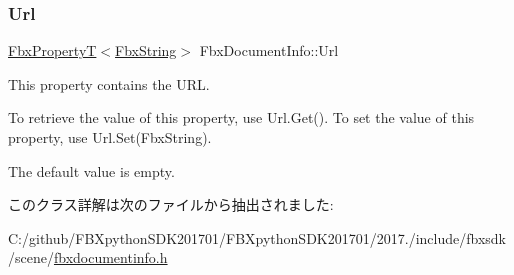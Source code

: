\subsubsection{\texorpdfstring{Url}{Url}}
{\footnotesize\ttfamily \hyperlink{class_fbx_property_t}{Fbx\+PropertyT}$<$\hyperlink{class_fbx_string}{Fbx\+String}$>$ Fbx\+Document\+Info\+::\+Url}

This property contains the U\+RL.

To retrieve the value of this property, use Url.\+Get(). To set the value of this property, use Url.\+Set(\+Fbx\+String).

The default value is empty. 

このクラス詳解は次のファイルから抽出されました\+:\begin{DoxyCompactItemize}
\item 
C\+:/github/\+F\+B\+Xpython\+S\+D\+K201701/\+F\+B\+Xpython\+S\+D\+K201701/2017./include/fbxsdk/scene/\hyperlink{fbxdocumentinfo_8h}{fbxdocumentinfo.\+h}\end{DoxyCompactItemize}

